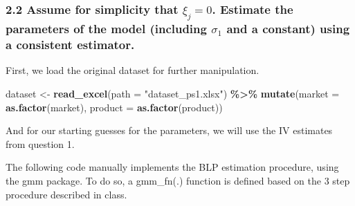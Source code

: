 \documentclass[
]{article}
\newenvironment{Shaded}{\begin{snugshade}}{\end{snugshade}}
\newcommand{\AttributeTok}[1]{\textcolor[rgb]{0.13,0.29,0.53}{#1}}
\newcommand{\FunctionTok}[1]{\textcolor[rgb]{0.13,0.29,0.53}{\textbf{#1}}}
\newcommand{\NormalTok}[1]{#1}
\newcommand{\OtherTok}[1]{\textcolor[rgb]{0.56,0.35,0.01}{#1}}
\newcommand{\SpecialCharTok}[1]{\textcolor[rgb]{0.81,0.36,0.00}{\textbf{#1}}}
\newcommand{\StringTok}[1]{\textcolor[rgb]{0.31,0.60,0.02}{#1}}
\begin{document}
\subsubsection{\texorpdfstring{2.2 Assume for simplicity that
\(\xi_j = 0\). Estimate the parameters of the model (including
\(\sigma_1\) and a constant) using a consistent
estimator.}{2.2 Assume for simplicity that \textbackslash xi\_j = 0. Estimate the parameters of the model (including \textbackslash sigma\_1 and a constant) using a consistent estimator.}}\label{assume-for-simplicity-that-xi_j-0.-estimate-the-parameters-of-the-model-including-sigma_1-and-a-constant-using-a-consistent-estimator.}

First, we load the original dataset for further manipulation.

\begin{Shaded}
\begin{Highlighting}[]
\NormalTok{dataset }\OtherTok{\textless{}{-}} \FunctionTok{read\_excel}\NormalTok{(}\AttributeTok{path =} \StringTok{"dataset\_ps1.xlsx"}\NormalTok{) }\SpecialCharTok{\%\textgreater{}\%}
  \FunctionTok{mutate}\NormalTok{(}\AttributeTok{market =} \FunctionTok{as.factor}\NormalTok{(market),}
         \AttributeTok{product =} \FunctionTok{as.factor}\NormalTok{(product))}
\end{Highlighting}
\end{Shaded}

And for our starting guesses for the parameters, we will use the IV
estimates from question 1.

The following code manually implements the BLP estimation procedure,
using the gmm package. To do so, a gmm\_fn(.) function is defined based
on the 3 step procedure described in class.
\end{document}
